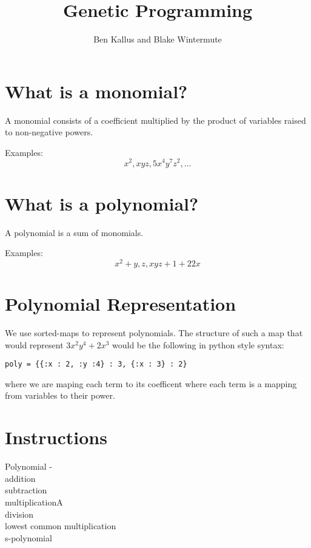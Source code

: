 \documentclass[12pt]{article}
\title{Genetic Programming}
\author{Ben Kallus and Blake Wintermute}
\date{ }
\begin{document}
\pagecolor{black}
\color{white}
\maketitle

\section*{What is a monomial?}

    A monomial consists of a coefficient multiplied by the product of variables raised to non-negative powers.

    Examples: $$x^2, xyz, 5x^4y^7z^2, \hdots$$

\section*{What is a polynomial?}

    A polynomial is a sum of monomials.

    Examples: $$x^2 + y, z, xyz + 1 + 22x$$



\newpage
\section*{Polynomial Representation}

We use sorted-maps to represent polynomials. The structure of such a map that would represent $3x^2y^4 + 2x^3$ would be the following in python style syntax:

\begin{verbatim}
poly = {{:x : 2, :y :4} : 3, {:x : 3} : 2}
\end{verbatim}

 where we are maping each term to its coefficent where each term is a mapping from variables to their power.


\newpage
\section*{Instructions}

Polynomial - \\
\indent addition \\
\indent subtraction     \\   
\indent multiplicationA \\
\indent division \\
\indent lowest common multiplication \\
\indent s-polynomial \\
\end{document}

